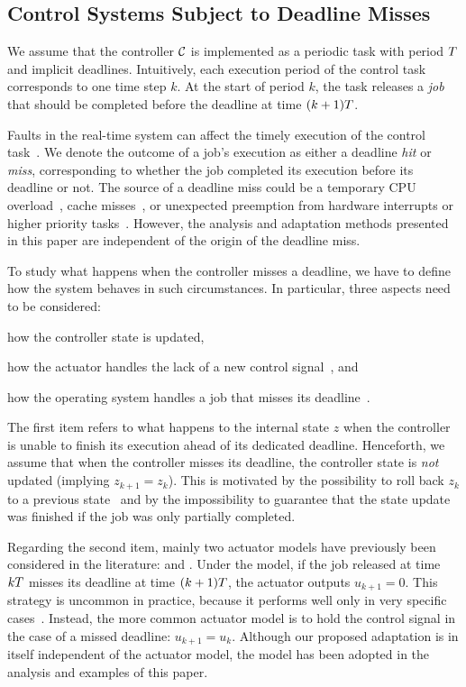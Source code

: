 \subsection{Control Systems Subject to Deadline Misses}

We assume that the controller $\mathcal{C}$ is implemented as a periodic task with period $T$ and implicit deadlines. 
Intuitively, each execution period of the control task corresponds to one time step $k$.
At the start of period $k$, the task releases a \emph{job} that should be completed before the deadline at time $(k+1) T$.

Faults in the real-time system can affect the timely execution of the control task~\cite{Steinbauer:2013}.
We denote the outcome of a job's execution as either a deadline \emph{hit} or \emph{miss}, corresponding to whether the job completed its execution before its deadline or not. 
The source of a deadline miss could be a temporary CPU overload~\cite{Baruah:1997}, cache misses~\cite{Milligan:1996, Wang:2012},  or unexpected preemption from hardware interrupts or higher priority tasks~\cite{Stankovic:1995}.
However, the analysis and adaptation methods presented in this paper are independent of the origin of the deadline miss.

To study what happens when the controller misses a deadline, we have to define how the system behaves in such circumstances.
In particular, three aspects need to be considered: 
\begin{enumerate*}[label=(\roman*)]
    \item how the controller state is updated, 
    \item how the actuator handles the lack of a new control signal~\cite{Schenato:2009}, and
    \item how the operating system handles a job that misses its deadline~\cite{Pazzaglia:2019, Cervin:2005}.
\end{enumerate*}
The first item refers to what happens to the internal state $z$ when the controller is unable to finish its execution ahead of its dedicated deadline.
Henceforth, we assume that when the controller misses its deadline, the controller state is \emph{not} updated (implying $z_{k+1} = z_k$). 
This is motivated by the possibility to roll back $z_k$ to a previous state~\cite{akesson:2020, Seong:2001, Zhang:2003} and by the impossibility to guarantee that the state update was finished if the job was only partially completed.

Regarding the second item, mainly two actuator models have previously been considered in the literature: \emph{\tZ{}} and \emph{\tH{}} \cite{Schenato:2009}.
Under the \tZ{} model, if the job released at time $kT$ misses its deadline at time  $(k+1)T$, the actuator outputs $u_{k+1} = 0$.
This strategy is uncommon in practice, because it performs well only in very specific cases~\cite{Vreman:2021ecrts}. 
Instead, the more common actuator model is to hold the control signal in the case of a missed deadline: $u_{k+1} = u_k$.
Although our proposed adaptation is in itself independent of the actuator model, the \tH{} model has been adopted in the analysis and examples of this paper.

